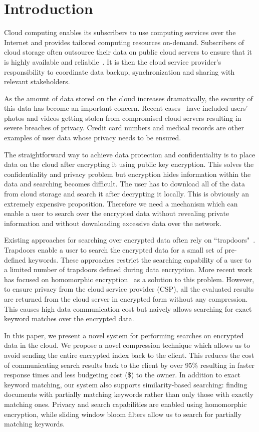 \section{Introduction}

Cloud computing enables its subscribers to use computing services over the 
Internet and provides tailored computing resources on-demand. 
Subscribers of cloud storage often outsource their data on public cloud servers
to ensure that it is highly available and reliabile~\cite{wang2012toward}. 
It is then the cloud service provider's
responsibility to coordinate data backup, synchronization and sharing
with relevant stakeholders. 

As the amount of data stored on the cloud increases dramatically, the security 
of this data has become an important concern. Recent cases~\cite{top_threats}
have included users' photos and videos getting stolen from compromised cloud servers resulting in
severe breaches of privacy. Credit card numbers and medical
records are other examples of user data whose privacy needs to be ensured.

The straightforward way to achieve data protection and confidentiality is to
place data on the cloud after encrypting it using public key encryption.
This solves the confidentiality and privacy problem
but encryption hides information within the data and searching becomes difficult. The user
has to download all of the data from cloud storage and search it after decrypting it locally. This is
obviously an extremely expensive proposition. Therefore we need a mechanism 
which can enable a user to search over the encrypted data without revealing 
private information and without downloading excessive data over the network.

Existing approaches for searching over encrypted data often rely on
``trapdoors"~\cite{song,goh2003secure,boneh}. 
Trapdoors enable a user to search the encrypted data for a small 
set of pre-defined keywords. These approaches restrict the searching
capability of a user to a limited number of trapdoors defined during data 
encryption. More recent work has focused on homomorphic encryption~\cite{craig,zeehan} as a solution
to this problem. However, to ensure privacy from the cloud service provider (CSP), 
all the evaluated results
are returned from the cloud server in encrypted form without any compression. This causes high data
communication cost but naively allows searching for exact keyword matches over the encrypted data.

In this paper, we present a novel system for performing searches on encrypted 
data in the cloud. We propose a novel compression technique which allows us to
avoid sending the entire encrypted index back to the client. This reduces
the cost of communicating search results back to the client by over 95\% resulting in 
faster response times and less budgeting cost (\$) to the owner. 
In addition to exact keyword matching, our system also
supports similarity-based searching: finding documents with partially matching 
keywords rather than only those with exactly matching ones. Privacy and search 
capabilities are enabled using homomorphic encryption, while sliding window 
bloom filters allow us to search for partially matching keywords. 


